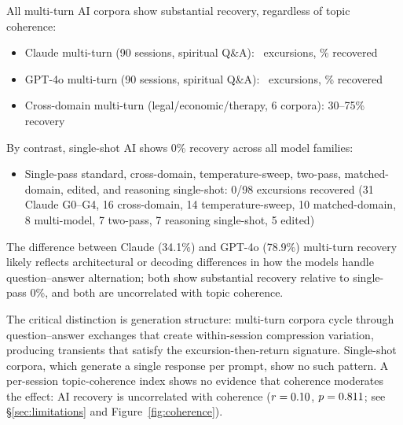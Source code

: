 \documentclass[11pt]{article}
\begin{document}
All multi-turn AI corpora show substantial recovery, regardless of topic coherence:
\begin{itemize}
\item Claude multi-turn (90 sessions, spiritual Q\&A): \excMTClaude\ excursions, \recClaudeMT\% recovered
\item GPT-4o multi-turn (90 sessions, spiritual Q\&A): \excMTGPT\ excursions, \recGPTMT\% recovered
\item Cross-domain multi-turn (legal/economic/therapy, 6 corpora): 30--75\% recovery
\end{itemize}

By contrast, single-shot AI shows 0\% recovery across all model families:
\begin{itemize}
\item Single-pass standard, cross-domain, temperature-sweep, two-pass, matched-domain, edited, and reasoning single-shot: 0/98 excursions recovered (31 Claude G0--G4, 16 cross-domain, 14 temperature-sweep, 10 matched-domain, 8 multi-model, 7 two-pass, 7 reasoning single-shot, 5 edited)
\end{itemize}

The difference between Claude (34.1\%) and GPT-4o (78.9\%) multi-turn recovery likely reflects architectural or decoding differences in how the models handle question--answer alternation; both show substantial recovery relative to single-pass 0\%, and both are uncorrelated with topic coherence.

The critical distinction is generation structure: multi-turn corpora cycle through question--answer exchanges that create within-session compression variation, producing transients that satisfy the excursion-then-return signature. Single-shot corpora, which generate a single response per prompt, show no such pattern. A per-session topic-coherence index shows no evidence that coherence moderates the effect: AI recovery is uncorrelated with coherence ($r = 0.10$, $p = 0.811$; see \S\ref{sec:limitations} and Figure~\ref{fig:coherence}).
\end{document}
